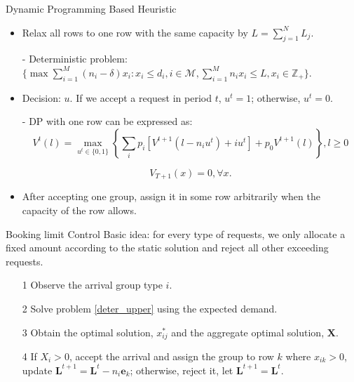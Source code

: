       \begin{frame}{Dynamic Programming Based Heuristic}
        \begin{itemize}
        \item Relax all rows to one row with the same capacity by $L = \sum_{j=1}^{N} L_j$.
        \item[-] Deterministic problem: $\{\max \sum_{i=1}^{M} (n_i- \delta) x_{i}: x_{i} \leq d_{i}, i \in \mathcal{M}, \sum_{i=1}^{M} n_{i} x_{i} \leq L, x_{i} \in \mathbb{Z}_{+}\}$.
        \item Decision: $u$. If we accept a request in period $t$, $u^t = 1$; otherwise, $u^t =0$.  
        \item[-] DP with one row can be expressed as:
        $$V^{t}(l) =  \max_{u^{t} \in \{0,1\}} \left\{ \sum_{i} p_i [V^{t+1}(l-n_i u^{t})+ i u^{t}] + p_0 V^{t+1}(l)\right\}, l \geq 0 $$

        $$V_{T+1}(x) =0, \forall x.$$
        \item After accepting one group, assign it in some row arbitrarily when the capacity of the row allows.
        \end{itemize}
      \end{frame}
      
      \begin{frame}{Booking limit Control}
        Basic idea: for every type of requests, we only allocate a fixed amount according to the static solution and reject all other exceeding requests.
        \begin{itemize}
          \item[1] Observe the arrival group type $i$.
          \item[2] Solve problem \eqref{deter_upper} using the expected demand.
          \item[3] Obtain the optimal solution, $x_{ij}^{*}$ and the aggregate optimal solution, $\mathbf{X}$.
          \item[4] If $X_{i} > 0$, accept the arrival and assign the group to row $k$ where $x_{ik} > 0$, update $\mathbf{L}^{t+1} = \mathbf{L}^{t} - n_i \mathbf{e}_{k}$; otherwise, reject it, let $\mathbf{L}^{t+1} = \mathbf{L}^{t}$.
        \end{itemize}
                 
      \end{frame}